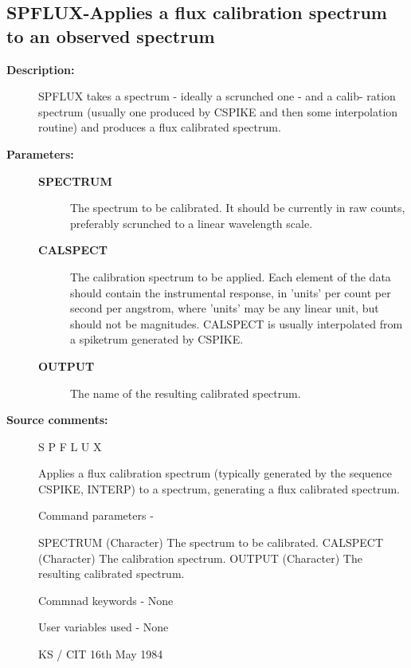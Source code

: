 \subsection{SPFLUX-\label{SPFLUX}Applies a flux calibration spectrum to an observed spectrum}
\begin{description}

\item [\textbf{Description:}]
 SPFLUX takes a spectrum - ideally a scrunched one - and a calib-
 ration spectrum (usually one produced by CSPIKE and then some
 interpolation routine) and produces a flux calibrated spectrum.

\item [\textbf{Parameters:}]
\begin{description}
\item [\textbf{SPECTRUM}]
 The spectrum to be calibrated.  It should be
 currently in raw counts, preferably scrunched to a linear
 wavelength scale.
\item [\textbf{CALSPECT}]
 The calibration spectrum to be applied.  Each
 element of the data should contain the instrumental
 response, in 'units' per count per second per angstrom,
 where 'units' may be any linear unit, but should not
 be magnitudes.  CALSPECT is usually interpolated from a
 spiketrum generated by CSPIKE.
\item [\textbf{OUTPUT}]
 The name of the resulting calibrated spectrum.
\end{description}

\item [\textbf{Source comments:}]
\begin{terminalv}
 S P F L U X

 Applies a flux calibration spectrum (typically generated
 by the sequence CSPIKE, INTERP) to a spectrum, generating
 a flux calibrated spectrum.

 Command parameters -

 SPECTRUM    (Character) The spectrum to be calibrated.
 CALSPECT    (Character) The calibration spectrum.
 OUTPUT      (Character) The resulting calibrated spectrum.

 Commnad keywords -  None

 User variables used -  None

                                 KS / CIT 16th May 1984
\end{terminalv}
\end{description}
